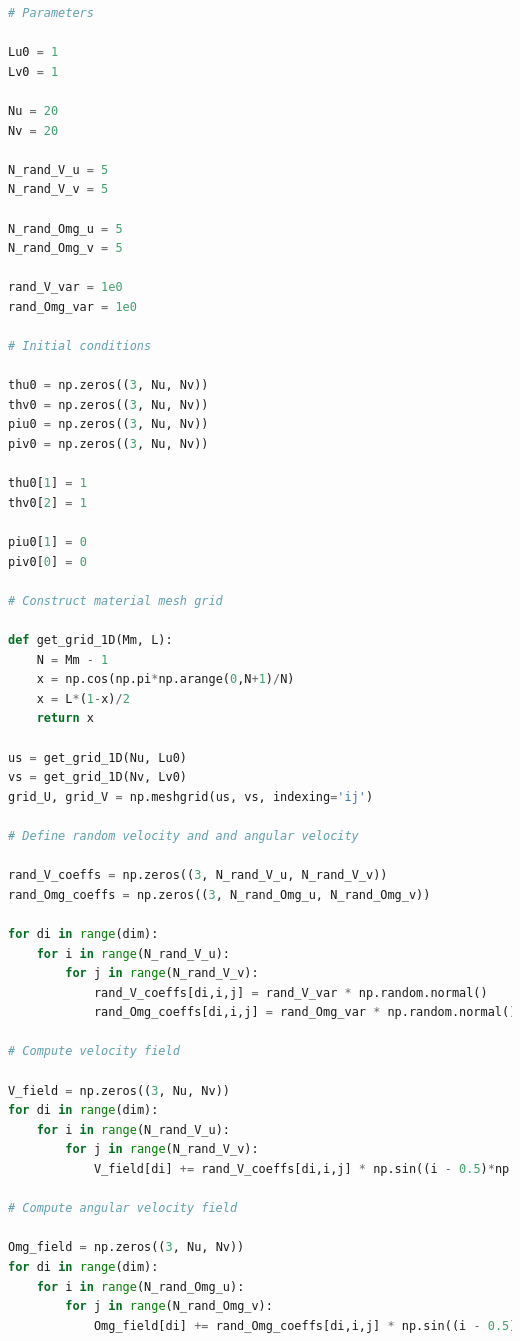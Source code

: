 \documentclass[]{cam-thesis}
\begin{document}
\begin{lstlisting}[language=Python, caption=Setting up initial conditions nad generating random velocity fields., label={lst:cosserat surface initial conditions}]
# Parameters

Lu0 = 1
Lv0 = 1

Nu = 20
Nv = 20

N_rand_V_u = 5
N_rand_V_v = 5

N_rand_Omg_u = 5
N_rand_Omg_v = 5

rand_V_var = 1e0
rand_Omg_var = 1e0

# Initial conditions

thu0 = np.zeros((3, Nu, Nv))
thv0 = np.zeros((3, Nu, Nv))
piu0 = np.zeros((3, Nu, Nv))
piv0 = np.zeros((3, Nu, Nv))

thu0[1] = 1
thv0[2] = 1

piu0[1] = 0
piv0[0] = 0

# Construct material mesh grid

def get_grid_1D(Mm, L):
    N = Mm - 1
    x = np.cos(np.pi*np.arange(0,N+1)/N)
    x = L*(1-x)/2
    return x

us = get_grid_1D(Nu, Lu0)
vs = get_grid_1D(Nv, Lv0)
grid_U, grid_V = np.meshgrid(us, vs, indexing='ij')

# Define random velocity and and angular velocity

rand_V_coeffs = np.zeros((3, N_rand_V_u, N_rand_V_v))
rand_Omg_coeffs = np.zeros((3, N_rand_Omg_u, N_rand_Omg_v))

for di in range(dim):
    for i in range(N_rand_V_u):
        for j in range(N_rand_V_v):
            rand_V_coeffs[di,i,j] = rand_V_var * np.random.normal()
            rand_Omg_coeffs[di,i,j] = rand_Omg_var * np.random.normal()
            
# Compute velocity field

V_field = np.zeros((3, Nu, Nv))
for di in range(dim):
    for i in range(N_rand_V_u):
        for j in range(N_rand_V_v):
            V_field[di] += rand_V_coeffs[di,i,j] * np.sin((i - 0.5)*np.pi*grid_U/Lu0) * np.sin((j - 0.5)*np.pi*grid_V/Lv0) / ( (i-0.5) * (j - 0.5) * np.pi**2 )

# Compute angular velocity field

Omg_field = np.zeros((3, Nu, Nv))
for di in range(dim):
    for i in range(N_rand_Omg_u):
        for j in range(N_rand_Omg_v):
            Omg_field[di] += rand_Omg_coeffs[di,i,j] * np.sin((i - 0.5)*np.pi*grid_U/Lu0) * np.sin((j - 0.5)*np.pi*grid_V/Lv0) / ( (i-0.5) * (j - 0.5) * np.pi**2 )
\end{lstlisting}
\end{document}
